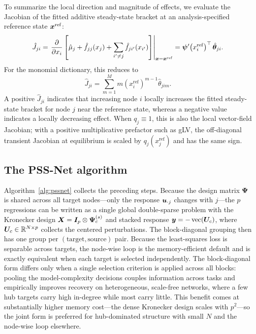 To summarize the local direction and magnitude of effects, we evaluate the
Jacobian of the fitted additive steady-state bracket at an analysis-specified
reference state $\bm{x}^{\mathrm{ref}}$:
\begin{equation}
  \hat J_{ji}
  =
  \left.
  \frac{\partial}{\partial x_i}
  \left[
  \hat\mu_j + \hat f_{jj}(x_j)
  + \sum_{i'\neq j}\hat f_{ji'}(x_{i'})
  \right]
  \right|_{\bm{x}=\bm{x}^{\mathrm{ref}}}
  =
  \bm{\psi}'\!\left(x_i^{\mathrm{ref}}\right)^\top \hat{\bm{\theta}}_{ji}.
  \label{eq:jacobian}
\end{equation}
For the monomial dictionary, this reduces to
\begin{equation}
  \hat J_{ji}
  =
  \sum_{m=1}^{M}
  m\left(x_i^{\mathrm{ref}}\right)^{m-1}\hat\theta_{jim}.
  \label{eq:jacobian-monomial}
\end{equation}
A positive $\hat J_{ji}$ indicates that increasing node $i$ locally increases
the fitted steady-state bracket for node $j$ near the reference state, whereas a
negative value indicates a locally decreasing effect.  When $q_j\equiv 1$, this
is also the local vector-field Jacobian; with a positive multiplicative
prefactor such as gLV, the off-diagonal transient Jacobian at equilibrium is
scaled by $q_j(x_j^{\mathrm{ref}})$ and has the same sign.

\subsection{The PSS-Net algorithm}
\label{sec:method:algorithm}

Algorithm~\ref{alg:pssnet} collects the preceding steps.  Because the design
matrix $\bm{\Psi}$ is shared across all target nodes---only the response
$\bm{u}_{\cdot j}$ changes with $j$---the $p$ regressions can be written as a single
global double-sparse problem with the Kronecker design $\bm{X}=\bm{I}_p\otimes\bm{\Psi}_{c}^{(s)}$
and stacked response $\bm{y}=-\operatorname{vec}(\bm{U}_{c})$, where
$\bm{U}_{c}\in\mathbb{R}^{N\times p}$ collects the centered perturbations.  The block-diagonal
grouping then has one group per $(\text{target},\text{source})$ pair.  Because
the least-squares loss is separable across targets, the node-wise loop is the
memory-efficient default and is exactly equivalent when each target is selected
independently.  The block-diagonal form differs only when a single selection
criterion is applied across all blocks: pooling the model-complexity decisions
couples information across tasks and empirically improves recovery on
heterogeneous, scale-free networks, where a few hub targets carry high in-degree
while most carry little.  This benefit comes at substantially higher memory
cost---the dense Kronecker design scales with $p^2$---so the joint form is
preferred for hub-dominated structure with small $N$ and the node-wise loop
elsewhere.

